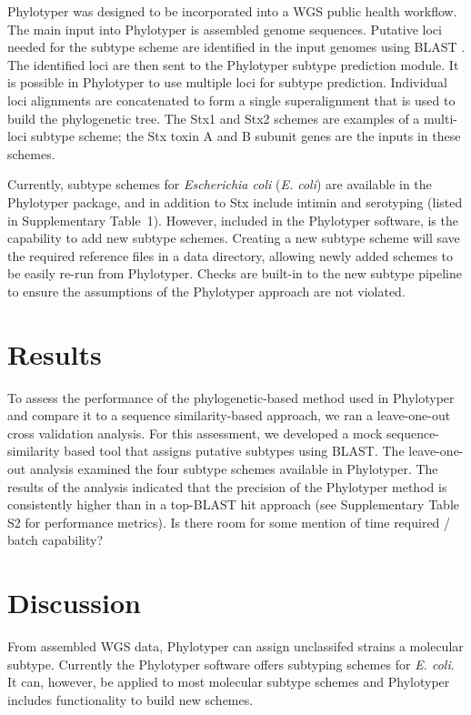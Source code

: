 \documentclass{bioinfo}
\begin{document}
Phylotyper was designed to be incorporated into a WGS public health workflow.  
The main input into Phylotyper is assembled genome sequences.  
Putative loci needed for the subtype scheme are identified in the input genomes using BLAST \citep{Camacho2009}.
The identified loci are then sent to the Phylotyper subtype prediction module.
It is possible in Phylotyper to use multiple loci for subtype prediction.
Individual loci alignments are concatenated to form a single superalignment that is used to build the phylogenetic tree.  
The Stx1 and Stx2 schemes are examples of a multi-loci subtype scheme; the Stx toxin A and B subunit genes are the inputs in these schemes.

Currently, subtype schemes for \emph{Escherichia coli} (\textit{E. coli}) are available in the Phylotyper package, and in addition to Stx include intimin and serotyping  (listed in Supplementary Table~1).
However, included in the Phylotyper software, is the capability to add new subtype schemes. 
Creating a new subtype scheme will save the required reference files in a data directory, allowing newly added schemes to be easily re-run from Phylotyper.
Checks are built-in to the new subtype pipeline to ensure the assumptions of the Phylotyper approach are not violated.  

\section{Results}

To assess the performance of the phylogenetic-based method used in Phylotyper and compare it to a sequence similarity-based approach, we ran a leave-one-out cross validation analysis.
For this assessment, we developed a mock sequence-similarity based tool that assigns putative subtypes using BLAST.
The leave-one-out analysis examined the four subtype schemes available in Phylotyper. The results of the analysis indicated that the precision of the Phylotyper method is consistently higher than in a top-BLAST hit approach (see Supplementary Table S2 for performance metrics). {Is there room for some mention of time required / batch capability?}

\section{Discussion}

From assembled WGS data, Phylotyper can assign unclassifed strains a molecular subtype.
Currently the Phylotyper software offers subtyping schemes for \textit{E. coli}.
It can, however, be applied to most molecular subtype schemes and Phylotyper includes functionality to build new schemes.
\end{document}
